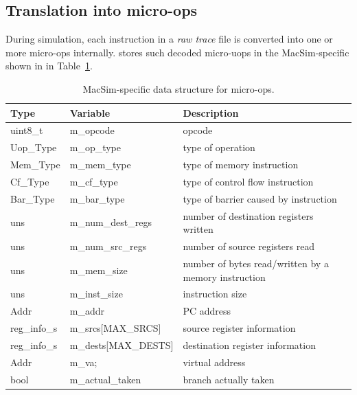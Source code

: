 \subsection{Translation into micro-ops}

During simulation, each instruction in a \emph{raw trace} file is converted
into one or more micro-ops internally. \SIM stores such decoded micro-uops in
the MacSim-specific shown in in Table~\ref{table:trace_uops}.

\begin{table}[htb]
\begin{footnotesize}
\begin{center}
\caption{MacSim-specific data structure for micro-ops.}
\label{table:trace_uops}
\begin{tabular}{|l|l|l|} 
\hline
Type      & Variable                 & Description \\ \hline \hline
uint8\_t  & m\_opcode                & opcode \\ \hline
Uop\_Type & m\_op\_type              & type of operation \\ \hline
Mem\_Type & m\_mem\_type             & type of memory instruction \\ \hline
Cf\_Type  & m\_cf\_type              & type of control flow instruction \\ \hline
Bar\_Type & m\_bar\_type             & type of barrier caused by instruction \\ \hline
uns       &   m\_num\_dest\_regs     & number of destination registers written \\ \hline
uns       &   m\_num\_src\_regs      & number of source registers read \\ \hline
uns       &   m\_mem\_size           & number of bytes read/written by a memory instruction \\ \hline
uns       &   m\_inst\_size          & instruction size \\ \hline
Addr      &   m\_addr                & PC address  \\ \hline
reg\_info\_s&   m\_srcs[MAX\_SRCS]   & source register information \\ \hline
reg\_info\_s&   m\_dests[MAX\_DESTS] & destination register information \\ \hline
Addr      &   m\_va;                 & virtual address \\ \hline
bool      &   m\_actual\_taken       & branch actually taken \\ \hline

\end{tabular}
\end{center}
\end{footnotesize}
\end{table}
